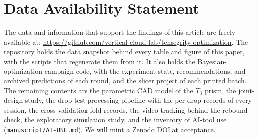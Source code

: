\documentclass[lineno,nocopyright,upint,varvw,hyphenate]{asmejour}
\providecommand{\repo}{https://github.com/vertical-cloud-lab/tensegrity-optimization}
\begin{document}
\section*{Data Availability Statement}
\providecommand{\repo}{https://github.com/vertical-cloud-lab/tensegrity-optimization}
The data and information that support the findings of this article are
freely available at: \url{\repo}. The repository holds the data
snapshot behind every table and figure of this paper, with the scripts
that regenerate them from it. It also holds the Bayesian-optimization
campaign code, with the experiment state, recommendations, and
archived predictions of each round, and the slicer project of each
printed batch. The remaining contents are the parametric CAD model of
the $T_3$ prism, the joint-design study, the drop-test processing
pipeline with the per-drop records of every session, the
cross-validation fold records, the video tracking behind the rebound check,
the exploratory simulation study, and the inventory of AI-tool use
(\texttt{manuscript/AI-USE.md}).
We will mint a Zenodo DOI at acceptance.
\end{document}
